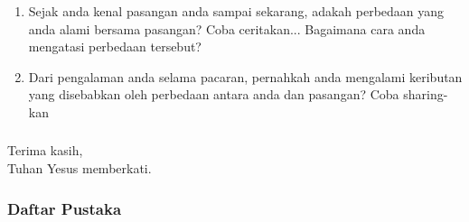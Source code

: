 \documentclass{beamer}
\begin{document}
\begin{frame}{}
	\Large
	\begin{enumerate}
		\item Sejak anda kenal pasangan anda sampai sekarang, adakah perbedaan yang anda alami bersama pasangan? 
		Coba ceritakan... Bagaimana cara anda mengatasi perbedaan tersebut?
		
		\bigskip
		\item Dari pengalaman anda selama pacaran, pernahkah anda mengalami keributan yang disebabkan oleh perbedaan antara anda dan pasangan? Coba sharing-kan
	\end{enumerate}
\end{frame}	












\begin{frame}
    \frametitle{}
    \centering
    
    \huge\color{oxfordblue}
    Terima kasih, \\
    Tuhan Yesus memberkati.

\end{frame}

\begin{frame}
\frametitle{Daftar Pustaka}
\small
\end{frame}

\end{document}
